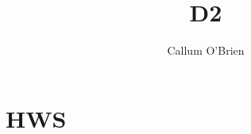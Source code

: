\documentclass{article}
\title{D2}
\author{Callum O'Brien}
\date{}
\begin{document}
\maketitle
\tableofcontents
\newpage

\section{HWS}

 
\end{document}
